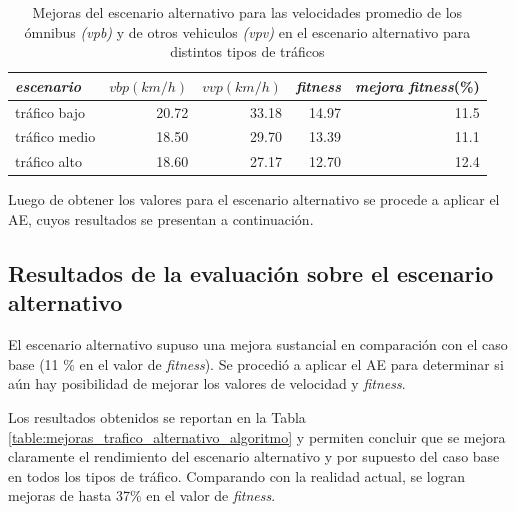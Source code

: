 \begin{table}[H]
	\renewcommand{\arraystretch}{1}
	\renewcommand{\tabcolsep}{12pt}	
	\caption[Mejoras del escenario alternativo.]{Mejoras del escenario alternativo  para las velocidades promedio de los ómnibus \textit{(vpb)} y de otros vehiculos \textit{(vpv)} en el escenario alternativo para distintos tipos de tráficos }
	\label{table:mejoras_trafico_alternativo}
	\centering
	\begin{tabular}{lrrrr }
		\toprule
		\textit{escenario}&
		$vbp(km/h)$& 
		$vvp(km/h)$ & 
		\textit{fitness} &
		\textit{mejora } \newline \textit{fitness}(\%)
		\\ 
		\midrule
		tráfico bajo & 20.72  & 33.18 & 14.97 & 11.5\\
		tráfico medio & 18.50  & 29.70& 13.39 & 11.1 \\
		tráfico alto  & 18.60  & 27.17& 12.70 & 12.4\\		
		\bottomrule
	\end{tabular}
\end{table}


Luego de obtener los valores para el escenario alternativo se procede a aplicar el AE, cuyos resultados se presentan a continuación.


\subsection{Resultados de la evaluación sobre el escenario alternativo}

El escenario alternativo supuso una mejora sustancial en comparación con el caso base (11 \% en el valor de \emph{fitness}). Se procedió a aplicar el AE para determinar si aún hay posibilidad de mejorar los valores de velocidad y \emph{fitness}.

Los resultados obtenidos se reportan en la Tabla \ref{table:mejoras_trafico_alternativo_algoritmo} y permiten concluir que se mejora claramente el rendimiento del escenario alternativo y por supuesto del caso base en todos los tipos de tráfico. Comparando con la realidad actual, se logran mejoras de hasta 37\% en el valor de \emph{fitness}. 


